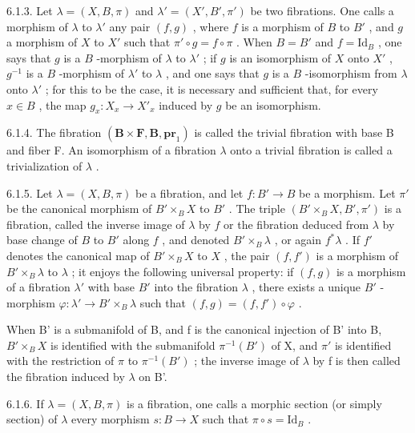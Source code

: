 6.1.3. Let \(\lambda = (X, B, \pi)\) and \(\lambda' = (X', B', \pi')\) be two fibrations. One calls a morphism of \(\lambda\) to \(\lambda'\) any pair \((f, g)\) , where \(f\) is a morphism of \(B\) to \(B'\) , and \(g\) a morphism of \(X\) to \(X'\) such that \(\pi' \circ g = f \circ \pi\) . When \(B = B'\) and \(f = \mathrm{Id}_B\) , one says that \(g\) is a \(B\) -morphism of \(\lambda\) to \(\lambda'\) ; if \(g\) is an isomorphism of \(X\) onto \(X'\) , \(g^{-1}\) is a \(B\) -morphism of \(\lambda'\) to \(\lambda\) , and one says that \(g\) is a \(B\) -isomorphism from \(\lambda\) onto \(\lambda'\) ; for this to be the case, it is necessary and sufficient that, for every \(x \in B\) , the map \(g_x: X_x \to X'_x\) induced by \(g\) be an isomorphism.

6.1.4. The fibration \((\mathbf{B} \times \mathbf{F}, \mathbf{B}, \mathbf{pr}_{1})\) is called the trivial fibration with base B and fiber F. An isomorphism of a fibration \(\lambda\) onto a trivial fibration is called a trivialization of \(\lambda\) .

6.1.5. Let \(\lambda = (X, B, \pi)\) be a fibration, and let \(f: B' \to B\) be a morphism. Let \(\pi'\) be the canonical morphism of \(B' \times_B X\) to \(B'\) . The triple \((B' \times_B X, B', \pi')\) is a fibration, called the inverse image of \(\lambda\) by \(f\) or the fibration deduced from \(\lambda\) by base change of \(B\) to \(B'\) along \(f\) , and denoted \(B' \times_B \lambda\) , or again \(f^*\lambda\) . If \(f'\) denotes the canonical map of \(B' \times_B X\) to \(X\) , the pair \((f, f')\) is a morphism of \(B' \times_B \lambda\) to \(\lambda\) ; it enjoys the following universal property: if \((f, g)\) is a morphism of a fibration \(\lambda'\) with base \(B'\) into the fibration \(\lambda\) , there exists a unique \(B'\) -morphism \(\varphi: \lambda' \to B' \times_B \lambda\) such that \((f, g) = (f, f') \circ \varphi\) .

When B' is a submanifold of B, and f is the canonical injection of B' into B, \(B' \times_{B} X\) is identified with the submanifold \(\pi^{-1}(B')\) of X, and \(\pi'\) is identified with the restriction of \(\pi\) to \(\pi^{-1}(B')\) ; the inverse image of \(\lambda\) by f is then called the fibration induced by \(\lambda\) on B'.

6.1.6. If \(\lambda = (X, B, \pi)\) is a fibration, one calls a morphic section (or simply section) of \(\lambda\) every morphism \(s: B \to X\) such that \(\pi \circ s = \mathrm{Id}_B\) .


